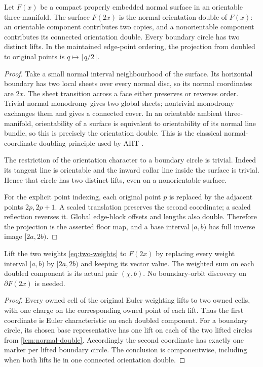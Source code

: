 \begin{lemma}
\label{lem:normal-double}
Let $F(x)$ be a compact properly embedded normal surface in an orientable
three-manifold. The surface $F(2x)$ is the normal orientation double of
$F(x)$: an orientable component contributes two copies, and a
nonorientable component contributes its connected orientation double.
Every boundary circle has two distinct lifts. In the maintained edge-point
ordering, the projection from doubled to original points is
$q\mapsto\lfloor q/2\rfloor$.
\end{lemma}
\begin{proof}
Take a small normal interval neighbourhood of the surface. Its horizontal
boundary has two local sheets over every normal disc, so its normal
coordinates are $2x$. The sheet transition across a face either preserves
or reverses order. Trivial normal monodromy gives two global sheets;
nontrivial monodromy exchanges them and gives a connected cover. In an
orientable ambient three-manifold, orientability of a surface is equivalent
to orientability of its normal line bundle, so this is precisely the
orientation double. This is the classical normal-coordinate doubling
principle used by AHT \cite{aht}.

The restriction of the orientation character to a boundary circle is
trivial. Indeed its tangent line is orientable and the inward collar line
inside the surface is trivial. Hence that circle has two distinct lifts,
even on a nonorientable surface.

For the explicit point indexing, each original point $p$ is replaced by
the adjacent points $2p,2p+1$. A scaled translation preserves the second
coordinate; a scaled reflection reverses it. Global edge-block offsets
and lengths also double. Therefore the projection is the asserted floor
map, and a base interval $[a,b)$ has full inverse image $[2a,2b)$.
\end{proof}

\begin{lemma}
\label{lem:one-boundary}
Lift the two weights \eqref{eq:two-weights} to $F(2x)$ by replacing every
weight interval $[a,b)$ by $[2a,2b)$ and keeping its vector value. The
weighted sum on each doubled component is its actual pair $(\chi,b)$.
No boundary-orbit discovery on $\partial F(2x)$ is needed.
\end{lemma}
\begin{proof}
Every owned cell of the original Euler weighting lifts to two owned cells,
with one charge on the corresponding owned point of each lift. Thus the
first coordinate is Euler characteristic on each doubled component.
For a boundary circle, its chosen base representative has one lift on
each of the two lifted circles from \cref{lem:normal-double}. Accordingly
the second coordinate has exactly one marker per lifted boundary circle.
The conclusion is componentwise, including when both lifts lie in one
connected orientation double.
\end{proof}

